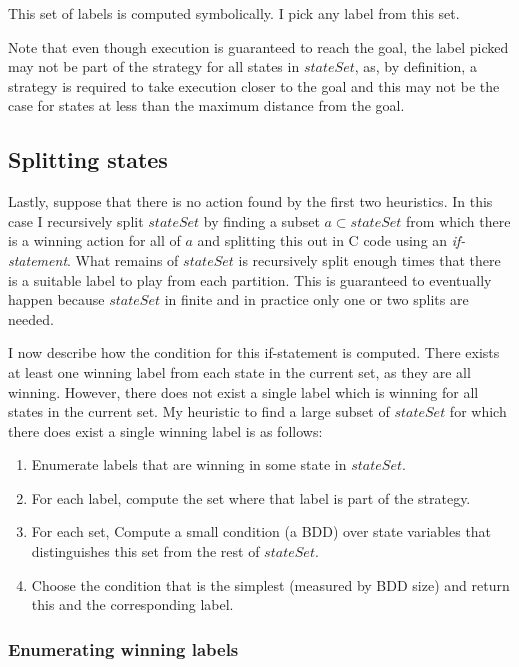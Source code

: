 This set of labels is computed symbolically. I pick any label from this set.

Note that even though execution is guaranteed to reach the goal, the label picked may not be part of the strategy for all states in $stateSet$, as, by definition, a strategy is required to take execution closer to the goal and this may not be the case for states at less than the maximum distance from the goal.

\subsection{Splitting states}

Lastly, suppose that there is no action found by the first two heuristics. In this case I recursively split $stateSet$ by finding a subset $a \subset stateSet$ from which there is a winning action for all of $a$ and splitting this out in C code using an \emph{if-statement}. What remains of $stateSet$ is recursively split enough times that there is a suitable label to play from each partition. This is guaranteed to eventually happen because $stateSet$ in finite and in practice only one or two splits are needed.

I now describe how the condition for this if-statement is computed. There exists at least one winning label from each state in the current set, as they are all winning. However, there does not exist a single label which is winning for all states in the current set. My heuristic to find a large subset of $stateSet$ for which there does exist a single winning label is as follows:

\begin{enumerate}
    \item Enumerate labels that are winning in some state in $stateSet$.
    \item For each label, compute the set where that label is part of the strategy.
    \item For each set, Compute a small condition (a BDD) over state variables that distinguishes this set from the rest of $stateSet$.
    \item Choose the condition that is the simplest (measured by BDD size) and return this and the corresponding label.
\end{enumerate}

\subsubsection{Enumerating winning labels}

